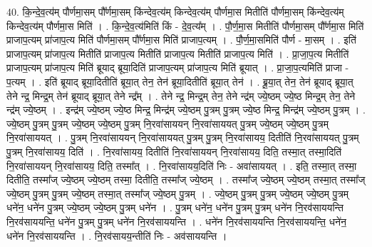 \documentclass[17pt]{extarticle}
\begin{document}
40. कि॒न्दे॒व॒त्य॑म् पौर्णमा॒सम् पौ᳚र्णमा॒सम् कि॑न्देव॒त्य॑म् किन्देव॒त्य॑म् पौर्णमा॒स मितीति॑ पौर्णमा॒सम् कि॑न्देव॒त्य॑म् किन्देव॒त्य॑म् पौर्णमा॒स मिति॑ । . कि॒न्दे॒व॒त्य॑मिति॑ किं - दे॒व॒त्य᳚म् । . पौ॒र्ण॒मा॒स मितीति॑ पौर्णमा॒सम् पौ᳚र्णमा॒स मिति॑ प्राजाप॒त्यम् प्रा॑जाप॒त्य मिति॑ पौर्णमा॒सम् पौ᳚र्णमा॒स मिति॑ प्राजाप॒त्यम् । . पौ॒र्ण॒मा॒समिति॑ पौर्ण - मा॒सम् । . इति॑ प्राजाप॒त्यम् प्रा॑जाप॒त्य मितीति॑ प्राजाप॒त्य मितीति॑ प्राजाप॒त्य मितीति॑ प्राजाप॒त्य मिति॑ । . प्रा॒जा॒प॒त्य मितीति॑ प्राजाप॒त्यम् प्रा॑जाप॒त्य मिति॑ ब्रूयाद् ब्रूया॒दिति॑ प्राजाप॒त्यम् प्रा॑जाप॒त्य मिति॑ ब्रूयात् । . प्रा॒जा॒प॒त्यमिति॑ प्राजा - प॒त्यम् । . इति॑ ब्रूयाद् ब्रूया॒दितीति॑ ब्रूया॒त् तेन॒ तेन॑ ब्रूया॒दितीति॑ ब्रूया॒त् तेन॑ । . ब्रू॒या॒त् तेन॒ तेन॑ ब्रूयाद् ब्रूया॒त् तेने न्द्र॒ मिन्द्र॒म् तेन॑ ब्रूयाद् ब्रूया॒त् तेने न्द्र᳚म् । . तेने न्द्र॒ मिन्द्र॒म् तेन॒ तेने न्द्र॑म् ज्ये॒ष्ठम् ज्ये॒ष्ठ मिन्द्र॒म् तेन॒ तेने न्द्र॑म् ज्ये॒ष्ठम् । . इन्द्र॑म् ज्ये॒ष्ठम् ज्ये॒ष्ठ मिन्द्र॒ मिन्द्र॑म् ज्ये॒ष्ठम् पु॒त्रम् पु॒त्रम् ज्ये॒ष्ठ मिन्द्र॒ मिन्द्र॑म् ज्ये॒ष्ठम् पु॒त्रम् । . ज्ये॒ष्ठम् पु॒त्रम् पु॒त्रम् ज्ये॒ष्ठम् ज्ये॒ष्ठम् पु॒त्रम् नि॒रवा॑साययन् नि॒रवा॑साययत् पु॒त्रम् ज्ये॒ष्ठम् ज्ये॒ष्ठम् पु॒त्रम् नि॒रवा॑साययत् । . पु॒त्रम् नि॒रवा॑साययन् नि॒रवा॑साययत् पु॒त्रम् पु॒त्रम् नि॒रवा॑सायय॒ दितीति॑ नि॒रवा॑साययत् पु॒त्रम् पु॒त्रम् नि॒रवा॑सायय॒ दिति॑ । . नि॒रवा॑सायय॒ दितीति॑ नि॒रवा॑साययन् नि॒रवा॑सायय॒ दिति॒ तस्मा॒त् तस्मा॒दिति॑ नि॒रवा॑साययन् नि॒रवा॑सायय॒ दिति॒ तस्मा᳚त् । . नि॒रवा॑सायय॒दिति॑ निः - अवा॑साययत् । . इति॒ तस्मा॒त् तस्मा॒ दितीति॒ तस्मा᳚ज् ज्ये॒ष्ठम् ज्ये॒ष्ठम् तस्मा॒ दितीति॒ तस्मा᳚ज् ज्ये॒ष्ठम् । . तस्मा᳚ज् ज्ये॒ष्ठम् ज्ये॒ष्ठम् तस्मा॒त् तस्मा᳚ज् ज्ये॒ष्ठम् पु॒त्रम् पु॒त्रम् ज्ये॒ष्ठम् तस्मा॒त् तस्मा᳚ज् ज्ये॒ष्ठम् पु॒त्रम् । . ज्ये॒ष्ठम् पु॒त्रम् पु॒त्रम् ज्ये॒ष्ठम् ज्ये॒ष्ठम् पु॒त्रम् धने॑न॒ धने॑न पु॒त्रम् ज्ये॒ष्ठम् ज्ये॒ष्ठम् पु॒त्रम् धने॑न । . पु॒त्रम् धने॑न॒ धने॑न पु॒त्रम् पु॒त्रम् धने॑न नि॒रव॑साययन्ति नि॒रव॑साययन्ति॒ धने॑न पु॒त्रम् पु॒त्रम् धने॑न नि॒रव॑साययन्ति । . धने॑न नि॒रव॑साययन्ति नि॒रव॑साययन्ति॒ धने॑न॒ धने॑न नि॒रव॑साययन्ति । . नि॒रव॑सायय॒न्तीति॑ निः - अव॑साययन्ति । \newline
\pagebreak
{}
\end{document}
